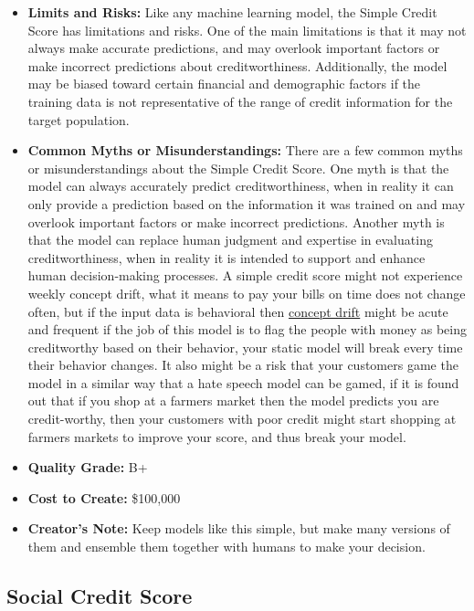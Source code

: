 \begin{itemize}
\begin{enumerate}
        \end{enumerate}
    \item \textbf{Limits and Risks:} Like any machine learning model, the Simple Credit Score has limitations and risks. One of the main limitations is that it may not always make accurate predictions, and may overlook important factors or make incorrect predictions about creditworthiness. Additionally, the model may be biased toward certain financial and demographic factors if the training data is not representative of the range of credit information for the target population.
    \item \textbf{Common Myths or Misunderstandings:} There are a few common myths or misunderstandings about the Simple Credit Score. One myth is that the model can always accurately predict creditworthiness, when in reality it can only provide a prediction based on the information it was trained on and may overlook important factors or make incorrect predictions. Another myth is that the model can replace human judgment and expertise in evaluating creditworthiness, when in reality it is intended to support and enhance human decision-making processes. A simple credit score might not experience weekly concept drift, what it means to pay your bills on time does not change often, but if the input data is behavioral then \hyperref[sec:drift]{concept drift} might be acute and frequent if the job of this model is to flag the people with money as being creditworthy based on their behavior, your static model will break every time their behavior changes. It also might be a risk that your customers game the model in a similar way that a hate speech model can be gamed, if it is found out that if you shop at a farmers market then the model predicts you are credit-worthy, then your customers with poor credit might start shopping at farmers markets to improve your score, and thus break your model.
    \item \textbf{Quality Grade:} B+
    \item \textbf{Cost to Create:} \$100,000
    \item \textbf{Creator's Note:} Keep models like this simple, but make many versions of them and ensemble them together with humans to make your decision. 
\end{itemize}

\subsection{Social Credit Score}

